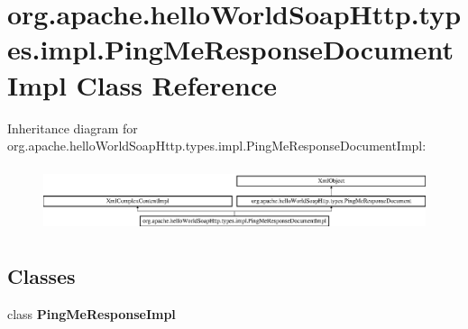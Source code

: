 \hypertarget{classorg_1_1apache_1_1hello_world_soap_http_1_1types_1_1impl_1_1_ping_me_response_document_impl}{}\section{org.\+apache.\+hello\+World\+Soap\+Http.\+types.\+impl.\+Ping\+Me\+Response\+Document\+Impl Class Reference}
\label{classorg_1_1apache_1_1hello_world_soap_http_1_1types_1_1impl_1_1_ping_me_response_document_impl}
Inheritance diagram for org.\+apache.\+hello\+World\+Soap\+Http.\+types.\+impl.\+Ping\+Me\+Response\+Document\+Impl\+:\begin{figure}[H]
\begin{center}
\leavevmode
\includegraphics[height=1.909091cm]{classorg_1_1apache_1_1hello_world_soap_http_1_1types_1_1impl_1_1_ping_me_response_document_impl}
\end{center}
\end{figure}
\subsection*{Classes}
\begin{DoxyCompactItemize}
\item 
class {\bfseries Ping\+Me\+Response\+Impl}
\end{DoxyCompactItemize}
